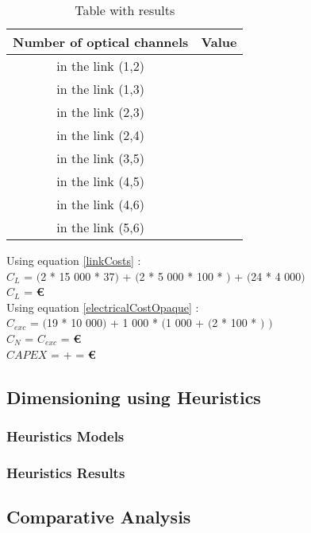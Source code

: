 \begin{table}[h!]
\centering
\begin{tabular}{|| c | c||}
 \hline
 Number of optical channels & Value \\
 \hline\hline
 in the link (1,2) &  \\
 in the link (1,3) &  \\
 in the link (2,3) &  \\
 in the link (2,4) &  \\
 in the link (3,5) &  \\
 in the link (4,5) &  \\
 in the link (4,6) &  \\
 in the link (5,6) &  \\
 \hline
\end{tabular}
\caption{Table with results}
\label{result_ILP4}
\end{table}


Using equation \ref{linkCosts} : \\
$C_L$ = $($2 * 15 000 * 37$)$ + $($2 * 5 000 * 100 * $)$ + $($24 * 4 000$)$ \\
$C_L$ = \textbf{ \euro} \\

Using equation \ref{electricalCostOpaque} : \\
$C_{exc}$ = $($19 * 10 000$)$ + 1 000 * $($1 000 + $($2 * 100 * $)$ $)$ \\
$C_N$ = $C_{exc}$ = \textbf{\euro} \\

$CAPEX$ =  +  = \textbf{\euro}\\

\newpage

\subsection{Dimensioning using Heuristics}

\subsubsection{Heuristics Models}

\subsubsection{Heuristics Results}

\subsection{Comparative Analysis}
